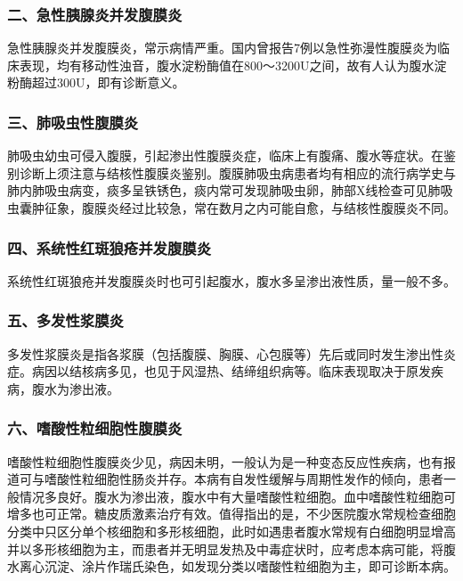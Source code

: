 \subsubsection{二、急性胰腺炎并发腹膜炎}

急性胰腺炎并发腹膜炎，常示病情严重。国内曾报告7例以急性弥漫性腹膜炎为临床表现，均有移动性浊音，腹水淀粉酶值在800～3200U之间，故有人认为腹水淀粉酶超过300U，即有诊断意义。

\subsubsection{三、肺吸虫性腹膜炎}

肺吸虫幼虫可侵入腹膜，引起渗出性腹膜炎症，临床上有腹痛、腹水等症状。在鉴别诊断上须注意与结核性腹膜炎鉴别。腹膜肺吸虫病患者均有相应的流行病学史与肺内肺吸虫病变，痰多呈铁锈色，痰内常可发现肺吸虫卵，肺部X线检查可见肺吸虫囊肿征象，腹膜炎经过比较急，常在数月之内可能自愈，与结核性腹膜炎不同。

\subsubsection{四、系统性红斑狼疮并发腹膜炎}

系统性红斑狼疮并发腹膜炎时也可引起腹水，腹水多呈渗出液性质，量一般不多。

\subsubsection{五、多发性浆膜炎}

多发性浆膜炎是指各浆膜（包括腹膜、胸膜、心包膜等）先后或同时发生渗出性炎症。病因以结核病多见，也见于风湿热、结缔组织病等。临床表现取决于原发疾病，腹水为渗出液。

\subsubsection{六、嗜酸性粒细胞性腹膜炎}

嗜酸性粒细胞性腹膜炎少见，病因未明，一般认为是一种变态反应性疾病，也有报道可与嗜酸性粒细胞性肠炎并存。本病有自发性缓解与周期性发作的倾向，患者一般情况多良好。腹水为渗出液，腹水中有大量嗜酸性粒细胞。血中嗜酸性粒细胞可增多也可正常。糖皮质激素治疗有效。值得指出的是，不少医院腹水常规检查细胞分类中只区分单个核细胞和多形核细胞，此时如遇患者腹水常规有白细胞明显增高并以多形核细胞为主，而患者并无明显发热及中毒症状时，应考虑本病可能，将腹水离心沉淀、涂片作瑞氏染色，如发现分类以嗜酸性粒细胞为主，即可诊断本病。

